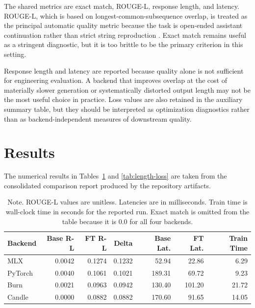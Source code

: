 \documentclass[11pt]{article}
\begin{document}
The shared metrics are exact match, ROUGE-L, response length, and latency. ROUGE-L, which is based on longest-common-subsequence overlap, is treated as the principal automatic quality metric because the task is open-ended assistant continuation rather than strict string reproduction \cite{rouge}. Exact match remains useful as a stringent diagnostic, but it is too brittle to be the primary criterion in this setting.

Response length and latency are reported because quality alone is not sufficient for engineering evaluation. A backend that improves overlap at the cost of materially slower generation or systematically distorted output length may not be the most useful choice in practice. Loss values are also retained in the auxiliary summary table, but they should be interpreted as optimization diagnostics rather than as backend-independent measures of downstream quality.

\section{Results}

The numerical results in Tables~\ref{tab:main-results} and \ref{tab:length-loss} are taken from the consolidated comparison report produced by the repository artifacts.

\begin{table}[t]
\centering
\small
\begin{tabular}{lrrrrrr}
\toprule
Backend & Base R-L & FT R-L & Delta & Base Lat. & FT Lat. & Train Time \\
\midrule
MLX      & 0.0042 & 0.1274 & 0.1232 &  52.94 &  22.86 &  6.29 \\
PyTorch  & 0.0040 & 0.1061 & 0.1021 & 189.31 &  69.72 &  9.23 \\
Burn     & 0.0021 & 0.0963 & 0.0942 & 130.40 & 101.20 & 21.72 \\
Candle   & 0.0000 & 0.0882 & 0.0882 & 170.60 &  91.65 & 14.05 \\
\bottomrule
\end{tabular}
\caption{Held-out comparison across the four backends.}
\label{tab:main-results}
\caption*{\footnotesize Note. ROUGE-L values are unitless. Latencies are in milliseconds. Train time is wall-clock time in seconds for the reported run. Exact match is omitted from the table because it is 0.0 for all four backends.}
\end{table}
\end{document}
